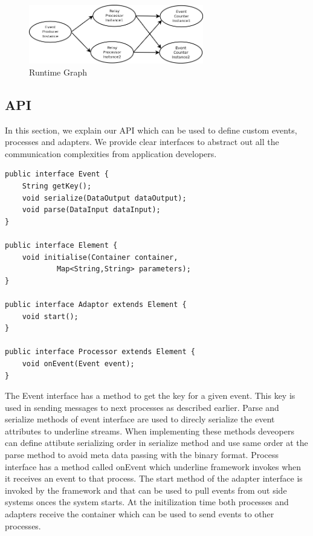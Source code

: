 \begin{figure}[!t]
        \centering
        \includegraphics[width=3.0in]{runtimegraph.png}
        \caption{Runtime Graph}
        \label{runtimegraph}
\end{figure}

\subsection{API}
In this section, we explain our API which can be used to define custom events, processes and adapters. We provide clear interfaces to abstract out all the communication complexities from application developers.



\begin{lstlisting}
public interface Event {
    String getKey();
    void serialize(DataOutput dataOutput);
    void parse(DataInput dataInput);
}

public interface Element {
    void initialise(Container container,
            Map<String,String> parameters);
}

public interface Adaptor extends Element {
    void start();
}

public interface Processor extends Element {
    void onEvent(Event event);
}
\end{lstlisting}

 The Event interface has a method to get the key for a given event. This key is used in sending messages to next processes as described earlier. Parse and serialize methods of event interface are used to direcly serialize the event attributes to underline streams. When implementing these methods deveopers can define attibute serializing order in serialize method and use same order at the parse method to avoid meta data passing with the binary format. Process interface has a method called onEvent which underline framework invokes when it receives an event to that process. The start method of the adapter interface is invoked by the framework and that can be used to pull events from out side systems onces the system starts. At the initilization time both processes and adapters receive the container which can be used to send events to other processes.
 
